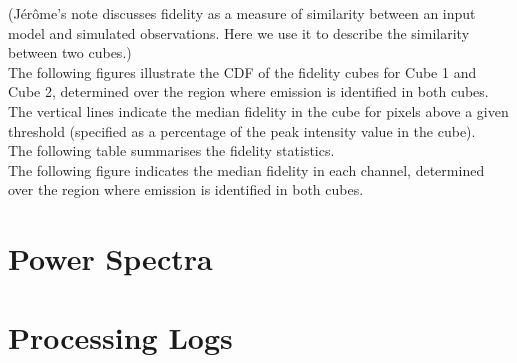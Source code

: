 \documentclass[11pt]{article}
\begin{document}
\noindent (J\'er\^ome's note discusses fidelity as a measure of similarity
between an input model and simulated observations. Here we use it to
describe the similarity between two cubes.)\\

\noindent The following figures illustrate the CDF of the fidelity cubes for
Cube 1 and Cube 2, determined over the region where emission is
identified in both cubes. The vertical lines indicate the median
fidelity in the cube for pixels above a given threshold (specified as
a percentage of the peak intensity value in the cube).\\




\noindent The following table summarises the fidelity statistics.\\



\noindent The following figure indicates the median fidelity in each channel,
determined over the region where emission is identified in both cubes.



\section{Power Spectra}
\label{sec:powerspec}
%
%

\section{Processing Logs}
\label{sec:logs}

\end{document}
